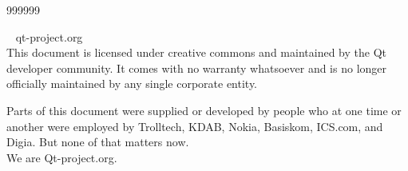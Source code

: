   \begin{slide}{999999}
  \begin{center}
    \textcopyright~ qt-project.org \\
    \vspace{.5em}
    This document is licensed under creative commons and maintained by
    the Qt developer community. It comes with no warranty whatsoever and
    is no longer officially maintained by any single corporate entity.
    \\
    \vspace{.5em}
    
    Parts of this document were supplied or developed by people who at
    one time or another were employed by Trolltech,  KDAB, Nokia,
    Basiskom, ICS.com, and Digia. But none of that matters now.\\
    We are Qt-project.org.\\
    \vspace{.5em}
    \end{center}
  \end{slide}
